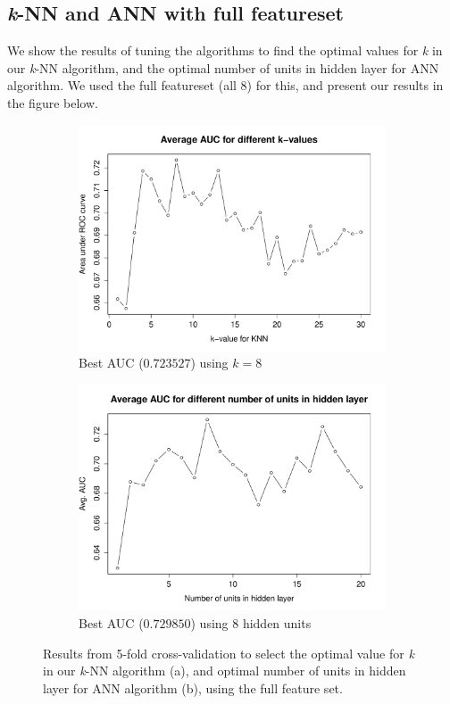 \documentclass{article}
\begin{document}
\subsection{\textit{k}-NN and ANN with full featureset}

We show the results of tuning the algorithms to find the optimal values for \textit{k} in our \textit{k}-NN algorithm, and the optimal number of units in hidden layer for ANN algorithm. We used the full featureset (all 8) for this, and present our results in the figure below.

\begin{figure}[htbp]
\centering
\begin{subfigure}{.5\textwidth}
  \centering
  \includegraphics[width=.8\linewidth]{figures/knn-full.pdf}
  \caption{Best AUC ($0.723527$) using $k=8$}
  \label{fig:sub1}
\end{subfigure}%
\begin{subfigure}{.5\textwidth}
  \centering
  \includegraphics[width=.8\linewidth]{figures/ann-full.pdf}
  \caption{Best AUC ($0.729850$) using 8 hidden units}
  \label{fig:sub2}
\end{subfigure}
\caption{Results from 5-fold cross-validation to select the optimal value for \textit{k} in our \textit{k}-NN algorithm (a), and optimal number of units in hidden layer for ANN algorithm (b), using the full feature set.}
\label{fig:test}
\end{figure}
\end{document}
